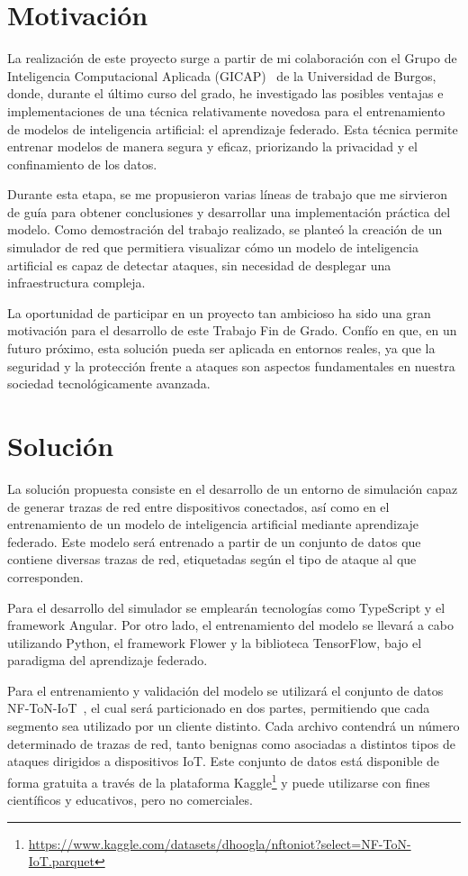 \section{Motivación}
\label{sec:Motivacion}
La realización de este proyecto surge a partir de mi colaboración con el Grupo de Inteligencia Computacional Aplicada (GICAP)~\cite{gicap} de la Universidad de Burgos, donde, durante el último curso del grado, he investigado las posibles ventajas e implementaciones de una técnica relativamente novedosa para el entrenamiento de modelos de inteligencia artificial: el aprendizaje federado. Esta técnica permite entrenar modelos de manera segura y eficaz, priorizando la privacidad y el confinamiento de los datos.

Durante esta etapa, se me propusieron varias líneas de trabajo que me sirvieron de guía para obtener conclusiones y desarrollar una implementación práctica del modelo. Como demostración del trabajo realizado, se planteó la creación de un simulador de red que permitiera visualizar cómo un modelo de inteligencia artificial es capaz de detectar ataques, sin necesidad de desplegar una infraestructura compleja.

La oportunidad de participar en un proyecto tan ambicioso ha sido una gran motivación para el desarrollo de este Trabajo Fin de Grado. Confío en que, en un futuro próximo, esta solución pueda ser aplicada en entornos reales, ya que la seguridad y la protección frente a ataques son aspectos fundamentales en nuestra sociedad tecnológicamente avanzada.

\section{Solución}
\label{sec:Solucion}
La solución propuesta consiste en el desarrollo de un entorno de simulación capaz de generar trazas de red entre dispositivos conectados, así como en el entrenamiento de un modelo de inteligencia artificial mediante aprendizaje federado. Este modelo será entrenado a partir de un conjunto de datos que contiene diversas trazas de red, etiquetadas según el tipo de ataque al que corresponden.

Para el desarrollo del simulador se emplearán tecnologías como TypeScript y el framework Angular. Por otro lado, el entrenamiento del modelo se llevará a cabo utilizando Python, el framework Flower y la biblioteca TensorFlow, bajo el paradigma del aprendizaje federado.

Para el entrenamiento y validación del modelo se utilizará el conjunto de datos NF-ToN-IoT~\cite{dataset}, el cual será particionado en dos partes, permitiendo que cada segmento sea utilizado por un cliente distinto. Cada archivo contendrá un número determinado de trazas de red, tanto benignas como asociadas a distintos tipos de ataques dirigidos a dispositivos IoT. Este conjunto de datos está disponible de forma gratuita a través de la plataforma Kaggle\footnote{\url{https://www.kaggle.com/datasets/dhoogla/nftoniot?select=NF-ToN-IoT.parquet}} y puede utilizarse con fines científicos y educativos, pero no comerciales.

